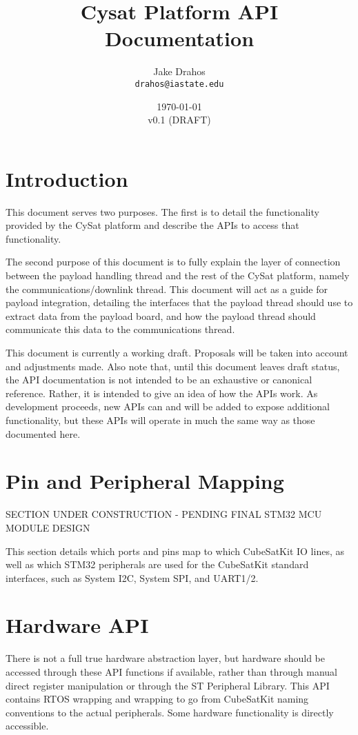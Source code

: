 \documentclass{article}
\begin{document}
\title{Cysat Platform API Documentation}
\author{Jake Drahos \\ \texttt{drahos@iastate.edu}}
\date{\today\\v0.1 (DRAFT)}

\maketitle

\tableofcontents

\section{Introduction}
This document serves two purposes. The first is to detail the functionality 
provided by the CySat platform and
describe the APIs to access that functionality.

The second purpose of this document is to fully explain the layer of connection
between the payload handling thread and the rest of the CySat platform, namely
the communications/downlink thread. This document will act as a guide for
payload integration, detailing the interfaces that the payload thread should
 use
to extract data from the payload board, and how the payload thread should 
communicate this data to the communications thread.

This document is currently a working draft. Proposals will be taken into account
and adjustments made. Also note that, until this document leaves draft status,
the API documentation is not intended to be an exhaustive or canonical
reference. Rather, it is intended to give an idea of how the APIs work. As
development proceeds, new APIs can and will be added to expose additional
functionality, but these APIs will operate in much the same way as those
documented here.

\section{Pin and Peripheral Mapping}

SECTION UNDER CONSTRUCTION - PENDING FINAL STM32 MCU MODULE DESIGN

This section details which ports and pins map to which CubeSatKit IO lines,
as well as which STM32 peripherals are used for the CubeSatKit standard 
interfaces, such as System I2C, System SPI, and UART1/2.

\section{Hardware API}
There is not a full true hardware abstraction layer, but hardware should be
accessed through these API functions if available, rather than through manual
direct register manipulation or through the ST Peripheral Library. This API
contains RTOS wrapping and wrapping to go from CubeSatKit naming conventions
to the actual peripherals. Some hardware functionality is directly accessible.
\\
\end{document}
